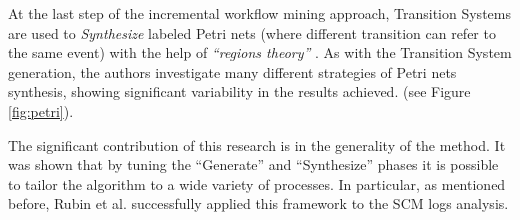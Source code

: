 At the last step of the incremental workflow mining approach, Transition Systems
are used to \textit{Synthesize} labeled Petri nets (where different transition
can refer to the same event) with the help of \textit{``regions theory''}
\cite{citeulike:5128170}. As with the Transition System generation, the authors
investigate many different strategies of Petri nets synthesis, showing
significant variability in the results achieved. (see Figure \ref{fig:petri}).

The significant contribution of this research is in the generality of the
method. It was shown that by tuning the ``Generate'' and ``Synthesize'' phases
it is possible to tailor the algorithm to a wide variety of processes. In
particular, as mentioned before, Rubin et al. successfully applied this
framework to the SCM logs analysis.